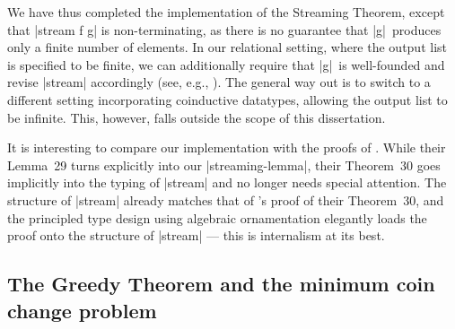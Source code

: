 We have thus completed the implementation of the Streaming Theorem, except that |stream f g| is non-terminating, as there is no guarantee that |g|~produces only a finite number of elements.
In our relational setting, where the output list is specified to be finite, we can additionally require that |g|~is well-founded and revise |stream| accordingly (see, e.g., \citet{Nordstrom-accessibility}).
The general way out is to switch to a different setting incorporating coinductive datatypes, allowing the output list to be infinite.
This, however, falls outside the scope of this dissertation.


It is interesting to compare our implementation with the proofs of \citet{Bird-arithmetic-coding}.
While their Lemma~29 turns explicitly into our |streaming-lemma|, their Theorem~30 goes implicitly into the typing of |stream| and no longer needs special attention.
The structure of |stream| already matches that of \citeauthor{Bird-arithmetic-coding}'s proof of their Theorem~30, and the principled type design using algebraic ornamentation elegantly loads the proof onto the structure of |stream| --- this is internalism at its best.

\subsection{The Greedy Theorem and the minimum coin change problem}
\label{sec:minimum-coin-change}


